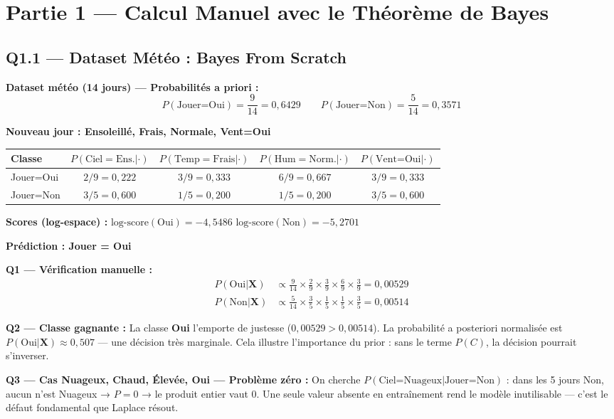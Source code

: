 \documentclass[12pt,a4paper]{article}
\begin{document}
\section{Partie 1 — Calcul Manuel avec le Théorème de Bayes}

\subsection{Q1.1 — Dataset Météo : Bayes From Scratch}

\begin{resultbox}
\textbf{Dataset météo (14 jours) — Probabilités a priori :}
\[
P(\text{Jouer=Oui}) = \frac{9}{14} = 0{,}6429 \qquad P(\text{Jouer=Non}) = \frac{5}{14} = 0{,}3571
\]

\textbf{Nouveau jour : Ensoleillé, Frais, Normale, Vent=Oui}
\begin{center}
\small
\begin{tabular}{lcccc}
\toprule
\textbf{Classe} & $P(\text{Ciel}=\text{Ens.}|\cdot)$ & $P(\text{Temp}=\text{Frais}|\cdot)$ & $P(\text{Hum}=\text{Norm.}|\cdot)$ & $P(\text{Vent=Oui}|\cdot)$ \\
\midrule
Jouer=Oui & $2/9 = 0{,}222$ & $3/9 = 0{,}333$ & $6/9 = 0{,}667$ & $3/9 = 0{,}333$ \\
Jouer=Non & $3/5 = 0{,}600$ & $1/5 = 0{,}200$ & $1/5 = 0{,}200$ & $3/5 = 0{,}600$ \\
\bottomrule
\end{tabular}
\end{center}

\textbf{Scores (log-espace) :} $\text{log-score}(\text{Oui}) = -4{,}5486$ \quad $\text{log-score}(\text{Non}) = -5{,}2701$

\textbf{Prédiction : Jouer = \textcolor{tealcolor}{Oui}}
\end{resultbox}

\begin{reponsebox}
\textbf{Q1 — Vérification manuelle :}
\begin{align*}
P(\text{Oui}|\mathbf{X}) &\propto \tfrac{9}{14} \times \tfrac{2}{9} \times \tfrac{3}{9} \times \tfrac{6}{9} \times \tfrac{3}{9} = 0{,}00529\\
P(\text{Non}|\mathbf{X}) &\propto \tfrac{5}{14} \times \tfrac{3}{5} \times \tfrac{1}{5} \times \tfrac{1}{5} \times \tfrac{3}{5} = 0{,}00514
\end{align*}

\textbf{Q2 — Classe gagnante :} La classe \textbf{Oui} l'emporte de justesse ($0{,}00529 > 0{,}00514$). La probabilité a posteriori normalisée est $P(\text{Oui}|\mathbf{X}) \approx 0{,}507$ — une décision très marginale. Cela illustre l'importance du prior : sans le terme $P(C)$, la décision pourrait s'inverser.

\textbf{Q3 — Cas Nuageux, Chaud, Élevée, Oui — Problème zéro :} On cherche $P(\text{Ciel=Nuageux} | \text{Jouer=Non})$ : dans les 5 jours Non, aucun n'est Nuageux → $P=0$ → le produit entier vaut 0. Une seule valeur absente en entraînement rend le modèle inutilisable — c'est le défaut fondamental que Laplace résout.
\end{reponsebox}
\end{document}
